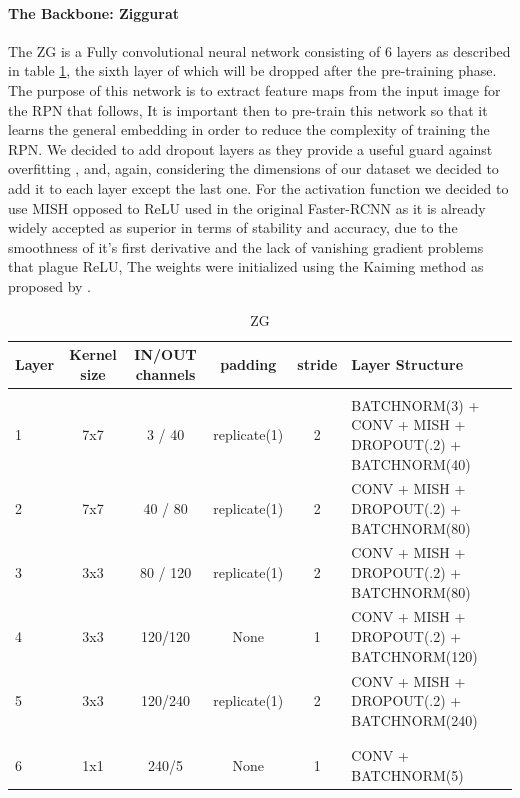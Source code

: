 \documentclass[10pt,journal,cspaper,compsoc]{IEEEtran}
\begin{document}
    \paragraph*{The Backbone: Ziggurat}
    The ZG is a Fully convolutional neural network consisting of 6 layers as described in table \ref{tab:Table 1}, the sixth layer of which will be dropped after the pre-training phase. 
    The purpose of this network is to extract feature maps from the input image for the RPN that follows,
    It is important then to pre-train this network so that it learns the general embedding in order 
    to reduce the complexity of training the RPN. 
    We decided to add dropout layers as they provide a useful guard against overfitting \cite{Srivastava:Dropout}, and, again, considering the dimensions of our dataset we decided to add it to each layer except the last one. For the activation function we decided to use MISH opposed to ReLU used in the original Faster-RCNN as it is already 
    widely accepted as superior in terms of stability and accuracy, due to the smoothness of it's first derivative and the lack of vanishing gradient problems that plague ReLU, The weights were initialized using the Kaiming method as proposed by \cite{arxiv:Kaiming}.
    \begin{table}[htb]
        \centering
		\caption{ZG}
		\label{tab:Table 1}
		\begin{tabularx}{.9\paperwidth}{l | c | c | c | c |  l}  
			\textbf{Layer} & \textbf{Kernel size} & \textbf{IN/OUT channels} & \textbf{padding} & \textbf{stride} & \textbf{Layer Structure}\\
			\hline 
			& & & & & \\
			1 & 7x7 & 3 / 40 & replicate(1) & 2 & BATCHNORM(3) + CONV + MISH + DROPOUT(.2) + BATCHNORM(40) \\
			2 & 7x7 & 40 / 80 & replicate(1) & 2 & CONV + MISH + DROPOUT(.2) + BATCHNORM(80) \\
			3 & 3x3 & 80 / 120 & replicate(1) & 2 & CONV + MISH + DROPOUT(.2) + BATCHNORM(80) \\ 
			4 & 3x3 & 120/120 & None & 1 & CONV + MISH + DROPOUT(.2) + BATCHNORM(120)  \\
			5 & 3x3 & 120/240 & replicate(1) & 2 & CONV + MISH + DROPOUT(.2) + BATCHNORM(240) \\
			& & & & & \\
			\hline
			& & & & & \\
			6 & 1x1 & 240/5 & None & 1 & CONV + BATCHNORM(5)
		\end{tabularx}
    \end{table}
    
\end{document}
